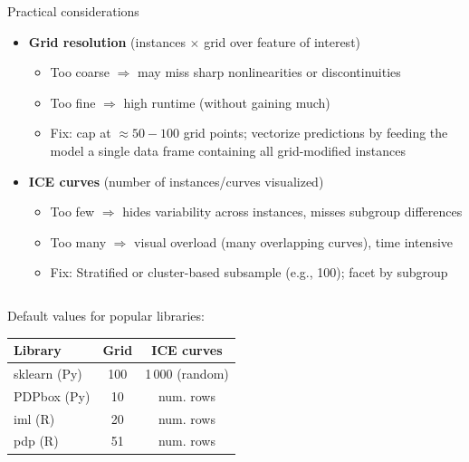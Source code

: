 \documentclass[10pt,compress,t,notes=noshow, xcolor=table]{beamer}
\begin{document}
\begin{frame}{Practical considerations}

\begin{itemize}
  \item \textbf{Grid resolution} (instances $\times$ grid over feature of interest)
        \begin{itemize}
            \item Too coarse $\Rightarrow$ may miss sharp nonlinearities or discontinuities
            \item Too fine $\Rightarrow$ high runtime (without gaining much)
            \item Fix: cap at $\approx 50 - 100$ grid points; vectorize predictions by feeding the model a single data frame containing all grid-modified instances
        \end{itemize}
  \item \textbf{ICE curves} (number of instances/curves visualized)
        \begin{itemize}
            \item Too few $\Rightarrow$ hides variability across instances, misses subgroup differences
            \item Too many $\Rightarrow$ visual overload (many overlapping curves), time intensive%
            \item Fix: Stratified or cluster-based subsample (e.g., 100); facet by subgroup
        \end{itemize}
\end{itemize}

\begin{columns}[T, onlytextwidth]
\begin{column}{0.5\textwidth}
\small

Default values for popular libraries: 

\medskip

\begin{tabular}{lcc}
\textbf{Library} & \textbf{Grid} & \textbf{ICE curves}\\\hline
sklearn (Py) & 100 & 1\,000 (random) \\
PDPbox  (Py) & 10  & num. rows\\
iml (R)      & 20  & num. rows\\
pdp (R)      & 51  & num. rows\\
\end{tabular}


\end{column}
\end{columns}
\end{frame}
\end{document}
